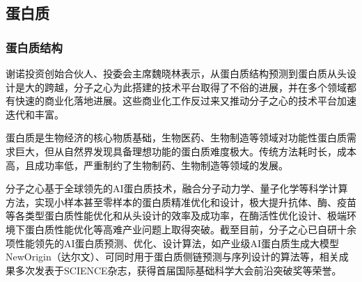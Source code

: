 \subsection{蛋白质}
\subsubsection{蛋白质结构}
谢诺投资创始合伙人、投委会主席魏晓林表示，从蛋白质结构预测到蛋白质从头设计是大的跨越，分子之心为此搭建的技术平台取得了不俗的进展，并在多个领域都有快速的商业化落地进展。这些商业化工作反过来又推动分子之心的技术平台加速迭代和丰富\cite{gill1985}。


蛋白质是生物经济的核心物质基础，生物医药、生物制造等领域对功能性蛋白质需求巨大，但从自然界发现具备理想功能的蛋白质难度极大。传统方法耗时长，成本高，且成功率低，严重制约了生物制药、生物制造等领域的发展。\par
分子之心基于全球领先的AI蛋白质技术，融合分子动力学、量子化学等科学计算方法，实现小样本甚至零样本的蛋白质精准优化和设计，极大提升抗体、酶、疫苗等各类型蛋白质性能优化和从头设计的效率及成功率，在酶活性优化设计、极端环境下蛋白质性能优化等高难产业问题上取得突破。截至目前，分子之心已自研十余项性能领先的AI蛋白质预测、优化、设计算法，如产业级AI蛋白质生成大模型NewOrigin（达尔文）、可同时用于蛋白质侧链预测与序列设计的算法等，相关成果多次发表于SCIENCE杂志，获得首届国际基础科学大会前沿突破奖等荣誉。